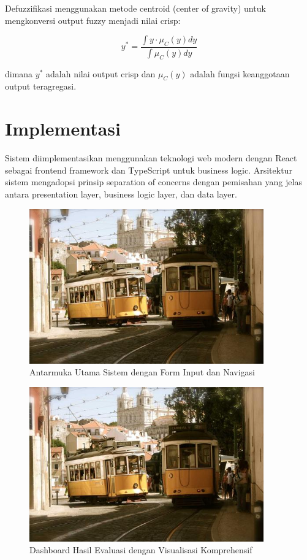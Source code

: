 \documentclass[12pt,a4paper]{article}
\begin{document}
Defuzzifikasi menggunakan metode centroid (center of gravity) untuk mengkonversi output fuzzy menjadi nilai crisp:

\begin{equation}
y^* = \frac{\int y \cdot \mu_C(y) dy}{\int \mu_C(y) dy}
\end{equation}

dimana $y^*$ adalah nilai output crisp dan $\mu_C(y)$ adalah fungsi keanggotaan output teragregasi.

\section{Implementasi}

Sistem diimplementasikan menggunakan teknologi web modern dengan React sebagai frontend framework dan TypeScript untuk business logic. Arsitektur sistem mengadopsi prinsip separation of concerns dengan pemisahan yang jelas antara presentation layer, business logic layer, dan data layer.

\begin{figure}[H]
    \centering
    \includegraphics[width=0.9\textwidth]{assets/image.png}
    \caption{Antarmuka Utama Sistem dengan Form Input dan Navigasi}
    \label{fig:ui-main}
\end{figure}

\begin{figure}[H]
    \centering
    \includegraphics[width=0.9\textwidth]{assets/image.png}
    \caption{Dashboard Hasil Evaluasi dengan Visualisasi Komprehensif}
    \label{fig:ui-results}
\end{figure}
\end{document}
